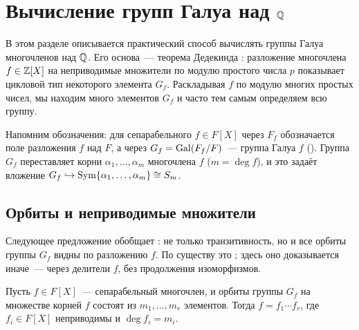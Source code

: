 \makeatletter
{}
\makeatother
\section{Вычисление групп Галуа над \texorpdfstring{$\mathbb Q$}{Q}}

В этом разделе описывается практический способ вычислять группы Галуа многочленов над $\mathbb Q$. Его основа~--- теорема
Дедекинда : разложение многочлена $f\in\mathbb Z[X]$ на неприводимые множители по модулю простого числа $p$ показывает
цикловой тип некоторого элемента $G_f$. Раскладывая $f$ по модулю многих простых чисел, мы находим много элементов $G_f$
и часто тем самым определяем всю группу.

Напомним обозначения: для сепарабельного $f\in F[X]$ через $F_f$ обозначается поле разложения $f$ над $F$, а через
$G_f=\operatorname{Gal}(F_f/F)$~--- группа Галуа $f$ (). Группа $G_f$ переставляет корни $\alpha_1,\dots,\alpha_m$ многочлена $f$
($m=\deg f$), и это задаёт вложение $G_f\hookrightarrow\operatorname{Sym}\{\alpha_1,\dots,\alpha_m\}\cong S_m$.

\subsection*{Орбиты и неприводимые множители}

Следующее предложение обобщает : не только транзитивность, но и все орбиты группы $G_f$ видны по разложению $f$. По
существу это ; здесь оно доказывается иначе~--- через делители $f$, без продолжения изоморфизмов.

\begin{proposition}[4.26]
Пусть $f\in F[X]$~--- сепарабельный многочлен, и орбиты группы $G_f$ на множестве корней $f$ состоят из $m_1,\dots,m_r$
элементов. Тогда $f=f_1\cdots f_r$, где $f_i\in F[X]$ неприводимы и $\deg f_i=m_i$.
\end{proposition}

